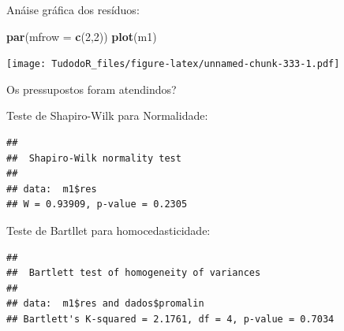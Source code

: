 \documentclass[
]{book}
\newenvironment{Shaded}{\begin{snugshade}}{\end{snugshade}}
\newcommand{\DataTypeTok}[1]{\textcolor[rgb]{0.13,0.29,0.53}{#1}}
\newcommand{\DecValTok}[1]{\textcolor[rgb]{0.00,0.00,0.81}{#1}}
\newcommand{\KeywordTok}[1]{\textcolor[rgb]{0.13,0.29,0.53}{\textbf{#1}}}
\newcommand{\NormalTok}[1]{#1}
\newcommand{\OperatorTok}[1]{\textcolor[rgb]{0.81,0.36,0.00}{\textbf{#1}}}
\newcommand{\StringTok}[1]{\textcolor[rgb]{0.31,0.60,0.02}{#1}}
\begin{document}
\begin{Shaded}
\end{Shaded}

Anáise gráfica dos resíduos:

\begin{Shaded}
\begin{Highlighting}[]
\KeywordTok{par}\NormalTok{(}\DataTypeTok{mfrow =} \KeywordTok{c}\NormalTok{(}\DecValTok{2}\NormalTok{,}\DecValTok{2}\NormalTok{))}
\KeywordTok{plot}\NormalTok{(m1)}
\end{Highlighting}
\end{Shaded}

\texttt{[image: TudodoR\_files/figure-latex/unnamed-chunk-333-1.pdf]}

Os pressupostos foram atendindos?

Teste de Shapiro-Wilk para Normalidade:

\begin{Shaded}
\end{Shaded}

\begin{verbatim}
## 
##  Shapiro-Wilk normality test
## 
## data:  m1$res
## W = 0.93909, p-value = 0.2305
\end{verbatim}

Teste de Bartllet para homocedasticidade:

\begin{Shaded}
\end{Shaded}

\begin{verbatim}
## 
##  Bartlett test of homogeneity of variances
## 
## data:  m1$res and dados$promalin
## Bartlett's K-squared = 2.1761, df = 4, p-value = 0.7034
\end{verbatim}
\end{document}

